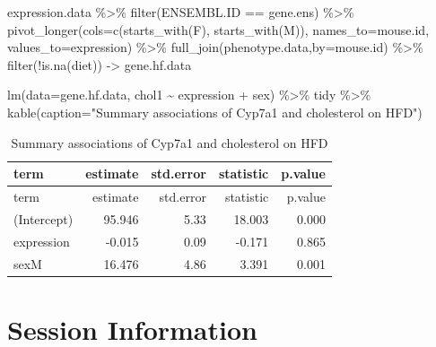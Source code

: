 \documentclass[
]{article}
\newenvironment{Shaded}{\begin{snugshade}}{\end{snugshade}}
\newcommand{\AttributeTok}[1]{\textcolor[rgb]{0.77,0.63,0.00}{#1}}
\newcommand{\FunctionTok}[1]{\textcolor[rgb]{0.00,0.00,0.00}{#1}}
\newcommand{\NormalTok}[1]{#1}
\newcommand{\OtherTok}[1]{\textcolor[rgb]{0.56,0.35,0.01}{#1}}
\newcommand{\SpecialCharTok}[1]{\textcolor[rgb]{0.00,0.00,0.00}{#1}}
\newcommand{\StringTok}[1]{\textcolor[rgb]{0.31,0.60,0.02}{#1}}
\begin{document}
\begin{Shaded}
\begin{Highlighting}[]
\NormalTok{expression.data }\SpecialCharTok{\%\textgreater{}\%}
  \FunctionTok{filter}\NormalTok{(ENSEMBL.ID }\SpecialCharTok{==}\NormalTok{ gene.ens) }\SpecialCharTok{\%\textgreater{}\%}
  \FunctionTok{pivot\_longer}\NormalTok{(}\AttributeTok{cols=}\FunctionTok{c}\NormalTok{(}\FunctionTok{starts\_with}\NormalTok{(}\StringTok{\textquotesingle{}F\textquotesingle{}}\NormalTok{),}
                      \FunctionTok{starts\_with}\NormalTok{(}\StringTok{\textquotesingle{}M\textquotesingle{}}\NormalTok{)),}
               \AttributeTok{names\_to=}\StringTok{\textquotesingle{}mouse.id\textquotesingle{}}\NormalTok{,}
               \AttributeTok{values\_to=}\StringTok{\textquotesingle{}expression\textquotesingle{}}\NormalTok{) }\SpecialCharTok{\%\textgreater{}\%}
  \FunctionTok{full\_join}\NormalTok{(phenotype.data,}\AttributeTok{by=}\StringTok{\textquotesingle{}mouse.id\textquotesingle{}}\NormalTok{) }\SpecialCharTok{\%\textgreater{}\%}
  \FunctionTok{filter}\NormalTok{(}\SpecialCharTok{!}\FunctionTok{is.na}\NormalTok{(diet)) }\OtherTok{{-}\textgreater{}}\NormalTok{ gene.hf.data}

\FunctionTok{lm}\NormalTok{(}\AttributeTok{data=}\NormalTok{gene.hf.data, chol1 }\SpecialCharTok{\textasciitilde{}}\NormalTok{ expression }\SpecialCharTok{+}\NormalTok{ sex) }\SpecialCharTok{\%\textgreater{}\%}
\NormalTok{  tidy }\SpecialCharTok{\%\textgreater{}\%}
  \FunctionTok{kable}\NormalTok{(}\AttributeTok{caption=}\StringTok{"Summary associations of Cyp7a1 and cholesterol on HFD"}\NormalTok{)}
\end{Highlighting}
\end{Shaded}

\begin{longtable}[]{@{}lrrrr@{}}
\caption{Summary associations of Cyp7a1 and cholesterol on
HFD}\tabularnewline
\toprule()
term & estimate & std.error & statistic & p.value \\
\midrule()
\endfirsthead
\toprule()
term & estimate & std.error & statistic & p.value \\
\midrule()
\endhead
(Intercept) & 95.946 & 5.33 & 18.003 & 0.000 \\
expression & -0.015 & 0.09 & -0.171 & 0.865 \\
sexM & 16.476 & 4.86 & 3.391 & 0.001 \\
\bottomrule()
\end{longtable}

\hypertarget{session-information}{%
\section{Session Information}\label{session-information}}
\end{document}
